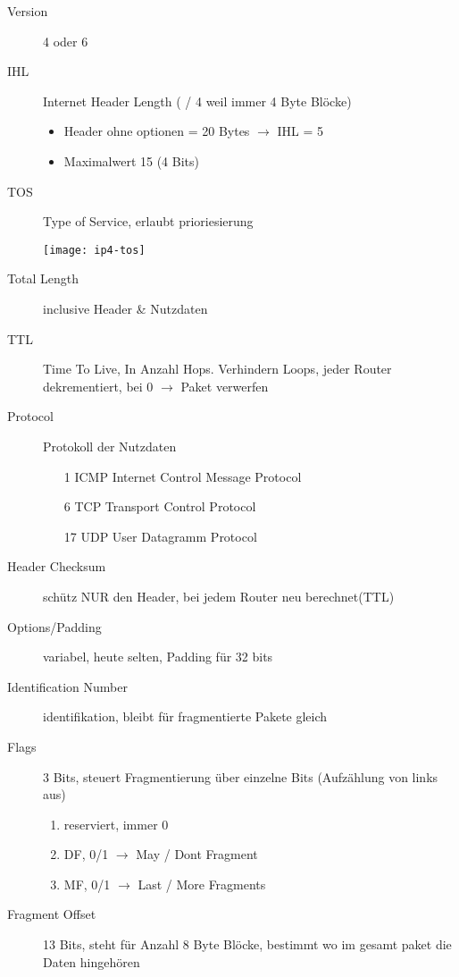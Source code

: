 \begin{description}
	\item[Version] 4 oder 6
	\item[IHL] Internet Header Length ( / 4 weil immer 4 Byte Blöcke)
		\begin{itemize}
			\item Header ohne optionen = 20 Bytes $\rightarrow$ IHL = 5
			\item Maximalwert 15 (4 Bits)
		\end{itemize}
	\item[TOS] Type of Service, erlaubt prioriesierung
		\begin{center}
			\texttt{[image: ip4-tos]}
		\end{center}
	\item[Total Length] inclusive Header \& Nutzdaten
	\item[TTL] Time To Live, In Anzahl Hops. Verhindern Loops, jeder Router
		dekrementiert, bei 0 $\rightarrow$ Paket verwerfen
	\item[Protocol] Protokoll der Nutzdaten
		\begin{enumerate}
			\item[1] ICMP Internet Control Message Protocol
			\item[6] TCP Transport Control Protocol
			\item[17] UDP User Datagramm Protocol
		\end{enumerate}
	\item[Header Checksum] schütz NUR den Header, bei jedem Router neu berechnet(TTL)
	\item[Options/Padding] variabel, heute selten, Padding für 32 bits
	\item[Identification Number] identifikation, bleibt für fragmentierte Pakete gleich
	\item[Flags] 3 Bits, steuert Fragmentierung über einzelne Bits
		(Aufzählung von links aus)
		\begin{enumerate}[start=0]
			\item reserviert, immer 0
			\item DF, 0/1 $\rightarrow$ May / Dont Fragment
			\item MF, 0/1 $\rightarrow$ Last / More Fragments
		\end{enumerate}
	\item[Fragment Offset] 13 Bits, steht für Anzahl 8 Byte Blöcke, bestimmt
		wo im gesamt paket die Daten hingehören
\end{description}


